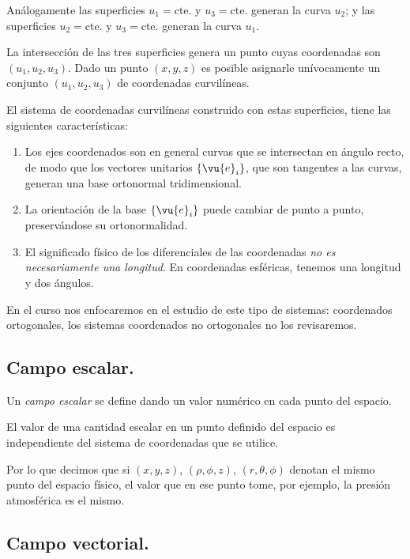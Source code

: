 Análogamente las superficies $u_{1} = \mbox{cte.}$ y $u_{3} = \mbox{cte.}$ generan la curva $u_{2}$; y las superficies $u_{2} = \mbox{cte.}$ y $u_{3} = \mbox{cte.}$ generan la curva $u_{1}$.
\par   
La intersección de las tres superficies genera un punto cuyas coordenadas son $(u_{1}, u_{2}, u_{3})$. Dado un punto $(x, y, z)$ es posible asignarle unívocamente un conjunto $(u_{1}, u_{2}, u_{3})$ de coordenadas curvilíneas.
\par
El sistema de coordenadas curvilíneas construido con estas superficies, tiene las siguientes características:
\begin{enumerate}
\item Los ejes coordenados son en general curvas que se intersectan en ángulo recto, de modo que los vectores unitarios $\left\{ \vu{e}_{i} \right\}$, que son tangentes a las curvas, generan una base ortonormal tridimensional.
\item La orientación de la base $\left\{ \vu{e}_{i} \right\}$ puede cambiar de punto a punto, preservándose su ortonormalidad.
\item El significado físico de los diferenciales de las coordenadas \emph{no es necesariamente una longitud}. En coordenadas esféricas, tenemos una longitud y dos ángulos.
\end{enumerate}
En el curso nos enfocaremos en el estudio de este tipo de sistemas: coordenados ortogonales, los sistemas coordenados no ortogonales no los revisaremos.

\subsection*{Campo escalar.}

Un \emph{campo escalar} se define dando un valor numérico en cada punto del espacio.
\par
El valor de una cantidad escalar en un punto definido del espacio es independiente del sistema de coordenadas que se utilice.
\par
Por lo que decimos que si $(x, y, z)$, $(\rho, \phi, z)$, $(r, \theta, \phi)$ denotan el mismo punto del espacio físico, el valor que en ese punto tome, por ejemplo, la presión atmosférica es el mismo.

\subsection*{Campo vectorial.}

